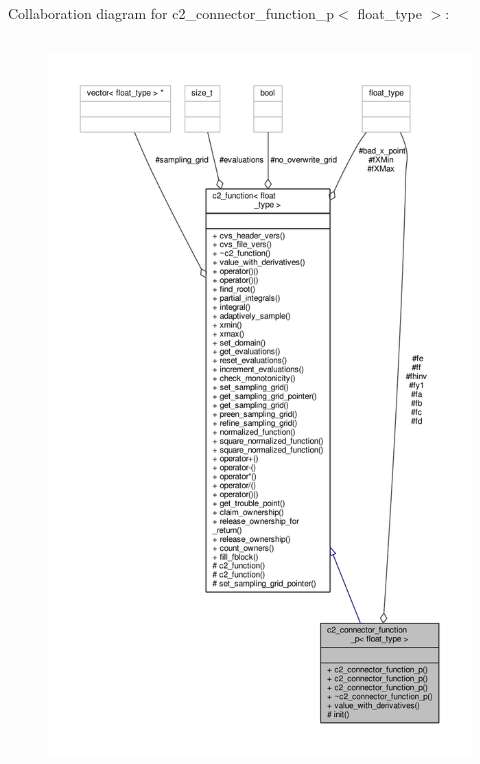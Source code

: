 Collaboration diagram for c2\+\_\+connector\+\_\+function\+\_\+p$<$ float\+\_\+type $>$\+:
\nopagebreak
\begin{figure}[H]
\begin{center}
\leavevmode
\includegraphics[height=550pt]{classc2__connector__function__p__coll__graph}
\end{center}
\end{figure}
